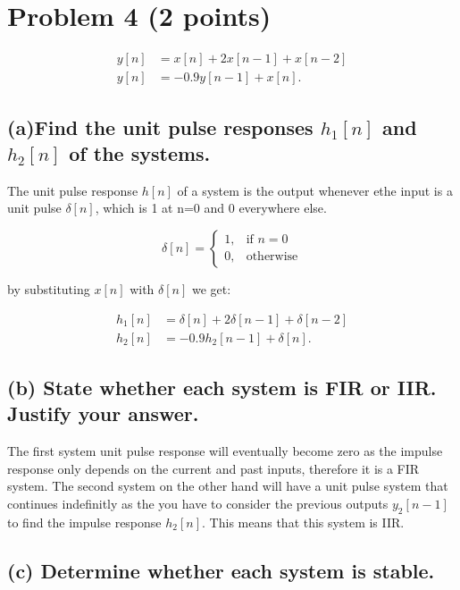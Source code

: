 \section{Problem 4 (2 points)}

\begin{align*}
    y[n]&=x[n]+2 x[n-1]+x[n-2] \\y[n]&=-0.9 y[n-1]+x[n] .
\end{align*}

\subsection*{(a)Find the unit pulse responses $h_1[n]$ and $h_2[n]$ of the systems.}

The unit pulse response $h[n]$ of a system is the output whenever ethe input is a unit pulse $\delta[n]$, which is 1 at n=0 and 0 everywhere else.

\begin{equation*}
    \delta[n] = 
    \begin{cases} 
        1, & \text{if } n = 0 \\
        0, & \text{otherwise}
    \end{cases}
\end{equation*}

by substituting $x[n]$ with $\delta[n]$ we get:

\begin{align*}
    h_1[n]&=\delta[n]+2 \delta[n-1]+\delta[n-2] \\h_2[n]&=-0.9 h_2[n-1]+\delta[n] .
\end{align*}

\subsection*{(b) State whether each system is FIR or IIR. Justify your answer.}

The first system unit pulse response will eventually become zero as the impulse response only depends on the current and past inputs, therefore it is a FIR system. The second system on the other hand will have a unit pulse system that continues indefinitly as the you have to consider the previous outputs $y_2[n-1]$ to find the impulse response $h_2[n]$. This means that this system is IIR.

\subsection*{(c) Determine whether each system is stable.}

